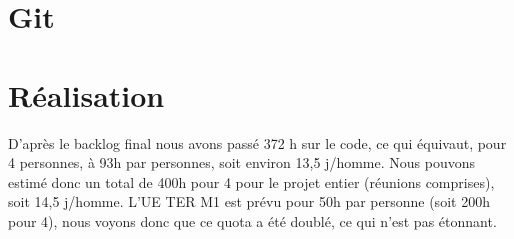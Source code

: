 \section{Git}


\section{Réalisation}
D'après le backlog final nous avons passé 372 h sur le code, ce qui équivaut, pour 4 personnes, à 93h par personnes, soit environ 13,5 j/homme.
Nous pouvons estimé donc un total de 400h pour 4 pour le projet entier (réunions comprises), soit 14,5 j/homme.
L'UE TER M1 est prévu pour 50h par personne (soit 200h pour 4), nous voyons donc que ce quota a été doublé, ce qui n'est pas étonnant.
